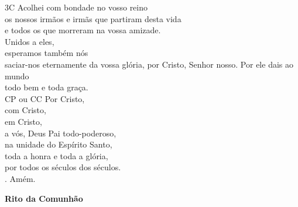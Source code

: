 \documentclass{book}
\begin{document}
\begin{flushleft}
    {\color{VioletRed2}3C} Acolhei com bondade no vosso reino \\
    os nossos irmãos e irmãs que partiram desta vida \\
    e todos os que morreram na vossa amizade. \\
    Unidos a eles, \\
    esperamos também nós \\
    saciar-nos eternamente da vossa glória,
    por Cristo, Senhor nosso.
    Por ele dais ao mundo \\
    todo bem e toda graça.
    \vspace{.2cm} \\
    {\color{VioletRed2}CP ou CC} Por Cristo, \\
    com Cristo, \\
    em Cristo, \\
    a vós, Deus Pai todo-poderoso, \\
    na unidade do Espírito Santo, \\
    toda a honra e toda a glória, \\
    por todos os séculos dos séculos.
    \vspace{.2cm} \\
    {\color{VioletRed2} \Rbar.} Amém.
\end{flushleft}
\begin{center}
    \textbf{Rito da Comunhão}
\end{center}
\end{document}
